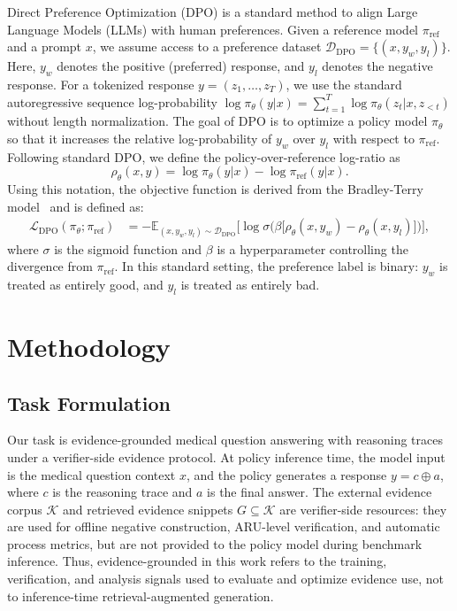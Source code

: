 \documentclass[a4paper,fleqn,doubleblind]{cas-sc}
\begin{document}
Direct Preference Optimization (DPO) is a standard method to align Large Language Models (LLMs) with human preferences.
Given a reference model $\pi_{\text{ref}}$ and a prompt $x$, we assume access to a preference dataset $\mathcal{D}_{\text{DPO}} = \{(x, y_w, y_l)\}$.
Here, $y_w$ denotes the positive (preferred) response, and $y_l$ denotes the negative response.
For a tokenized response $y=(z_1,\dots,z_T)$, we use the standard autoregressive sequence log-probability $\log \pi_\theta(y|x)=\sum_{t=1}^{T}\log \pi_\theta(z_t|x,z_{<t})$ without length normalization.
The goal of DPO is to optimize a policy model $\pi_\theta$ so that it increases the relative log-probability of $y_w$ over $y_l$ with respect to $\pi_{\text{ref}}$.
Following standard DPO, we define the policy-over-reference log-ratio as
\[
\rho_\theta(x,y)
=
\log \pi_\theta(y|x)
-
\log \pi_{\text{ref}}(y|x).
\]
Using this notation, the objective function is derived from the Bradley-Terry model~\cite{bradley1952rank} and is defined as:
\begin{equation}
\begin{split}
\mathcal{L}_{\text{DPO}}(\pi_\theta; \pi_{\text{ref}})
&= - \mathbb{E}_{(x, y_w, y_l) \sim \mathcal{D}_{\text{DPO}}} \Big[ \log \sigma \Big( \beta \big[\rho_\theta(x,y_w)-\rho_\theta(x,y_l)\big] \Big) \Big],
\end{split}
\end{equation}
where $\sigma$ is the sigmoid function and $\beta$ is a hyperparameter controlling the divergence from $\pi_{\text{ref}}$.
In this standard setting, the preference label is binary: $y_w$ is treated as entirely good, and $y_l$ is treated as entirely bad.

\section{Methodology}

\subsection{Task Formulation}
\label{sec:formulation}

Our task is evidence-grounded medical question answering with reasoning traces under a verifier-side evidence protocol. At policy inference time, the model input is the medical question context $x$, and the policy generates a response $y=c\oplus a$, where $c$ is the reasoning trace and $a$ is the final answer. The external evidence corpus $\mathcal{K}$ and retrieved evidence snippets $G \subseteq \mathcal{K}$ are verifier-side resources: they are used for offline negative construction, ARU-level verification, and automatic process metrics, but are not provided to the policy model during benchmark inference. Thus, evidence-grounded in this work refers to the training, verification, and analysis signals used to evaluate and optimize evidence use, not to inference-time retrieval-augmented generation.
\end{document}
